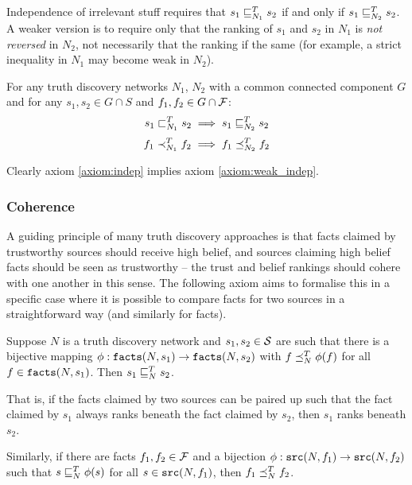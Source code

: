 \documentclass[../main.tex]{subfiles}
\begin{document}
Independence of irrelevant stuff requires that $s_1 \sle_{N_1}^T s_2$ if and
only if $s_1 \sle_{N_2}^T s_2$. A weaker version is to require only that the
ranking of $s_1$ and $s_2$ in $N_1$ is \emph{not reversed} in $N_2$, not
necessarily that the ranking if the same (for example, a strict inequality in
$N_1$ may become weak in $N_2$).

\begin{axiom}
\label{axiom:weak_indep}
For any truth discovery networks $N_1$, $N_2$ with a common connected component
$G$ and for any $s_1, s_2 \in G \cap S$ and $f_1, f_2 \in G \cap \F$:
\[
    s_1 \slt_{N_1}^T s_2 \implies s_1 \sle_{N_2}^T s_2
\]
\[
    f_1 \flt_{N_1}^T f_2 \implies f_1 \fle_{N_2}^T f_2
\]
\end{axiom}

Clearly axiom \ref{axiom:indep} implies axiom \ref{axiom:weak_indep}.

\subsubsection*{Coherence}

A guiding principle of many truth discovery approaches is that facts claimed by
trustworthy sources should receive high belief, and sources claiming high
belief facts should be seen as trustworthy -- the trust and belief rankings
should cohere with one another in this sense. The following axiom aims to
formalise this in a specific case where it is possible to compare facts for two
sources in a straightforward way (and similarly for facts).


\begin{axiom}[Coherence]
Suppose $N$ is a truth discovery network and $s_1, s_2 \in \S$ are such that
there is a bijective mapping $\phi: \fact(N, s_1) \rightarrow \fact(N, s_2)$
with $f \fle_N^T \phi(f)$ for all $f \in \fact(N, s_1)$. Then $s_1 \sle_N^T
s_2$.

That is, if the facts claimed by two sources can be paired up such that the
fact claimed by $s_1$ always ranks beneath the fact claimed by $s_2$, then
$s_1$ ranks beneath $s_2$.

Similarly, if there are facts $f_1, f_2 \in \F$ and a bijection $\phi: \src(N,
f_1) \rightarrow \src(N, f_2)$ such that $s \sle_N^T \phi(s)$ for all $s \in
\src(N, f_1)$, then $f_1 \fle_N^T f_2$.

\end{axiom}
\end{document}

